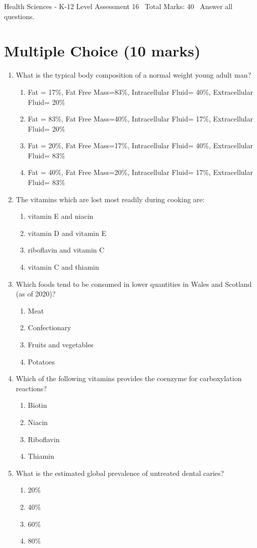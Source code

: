 \documentclass[12pt]{article}
\begin{document}
\begin{center}
Health Sciences - K-12 Level Assessment 16 \
Total Marks: 40 \
Answer all questions.
\end{center}

\section*{Multiple Choice (10 marks)}
\begin{enumerate}[label=\arabic*.]
\item What is the typical body composition of a normal weight young adult man?
\begin{enumerate}[label=(\alph*)]
    \item Fat = 17\%, Fat Free Mass=83\%, Intracellular Fluid= 40\%, Extracellular Fluid= 20\%
    \item Fat = 83\%, Fat Free Mass=40\%, Intracellular Fluid= 17\%, Extracellular Fluid= 20\%
    \item Fat = 20\%, Fat Free Mass=17\%, Intracellular Fluid= 40\%, Extracellular Fluid= 83\%
    \item Fat = 40\%, Fat Free Mass=20\%, Intracellular Fluid= 17\%, Extracellular Fluid= 83\%
\end{enumerate}
\item The vitamins which are lost most readily during cooking are:
\begin{enumerate}[label=(\alph*)]
    \item vitamin E and niacin
    \item vitamin D and vitamin E
    \item riboflavin and vitamin C
    \item vitamin C and thiamin
\end{enumerate}
\item Which foods tend to be consumed in lower quantities in Wales and Scotland (as of 2020)?
\begin{enumerate}[label=(\alph*)]
    \item Meat
    \item Confectionary
    \item Fruits and vegetables
    \item Potatoes
\end{enumerate}
\item Which of the following vitamins provides the coenzyme for carboxylation reactions?
\begin{enumerate}[label=(\alph*)]
    \item Biotin
    \item Niacin
    \item Riboflavin
    \item Thiamin
\end{enumerate}
\item What is the estimated global prevalence of untreated dental caries?
\begin{enumerate}[label=(\alph*)]
    \item 20\%
    \item 40\%
    \item 60\%
    \item 80\%
\end{enumerate}
\end{enumerate}
\end{document}
